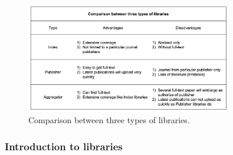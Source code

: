 \begin{figure}[htb]
	\begin{center}
		\includegraphics[width=0.8\textwidth]{Wolverine_Background_Chart_1}
	\end{center}
	\caption{Comparison between three types of libraries.\label{WBC1}}
\end{figure}
\newpage

\subsubsection{Introduction to libraries }

